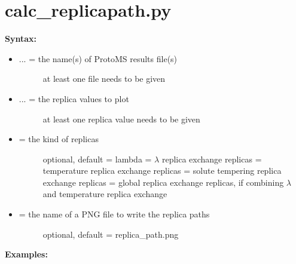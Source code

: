 \documentclass[letterpaper,10pt,english]{manual}
\begin{document}
\section{calc\_replicapath.py}

\textbf{Syntax:}

\begin{itemize}
\item {} \begin{description}
\item[{ ... = the name(s) of ProtoMS results file(s)}] \leavevmode
at least one file needs to be given

\end{description}

\item {} \begin{description}
\item[{ ... = the replica values to plot}] \leavevmode
at least one replica value needs to be given

\end{description}

\item {} \begin{description}
\item[{ = the kind of replicas}] \leavevmode
optional, default = lambda
 = $\lambda$ replica exchange replicas
 = temperature replica exchange replicas
 = solute tempering replica exchange replicas
 = global replica exchange replicas, if combining $\lambda$ and temperature replica exchange

\end{description}

\item {} \begin{description}
\item[{ = the name of a PNG file to write the replica paths}] \leavevmode
optional, default = replica\_path.png

\end{description}

\end{itemize}

\textbf{Examples:}
\end{document}
